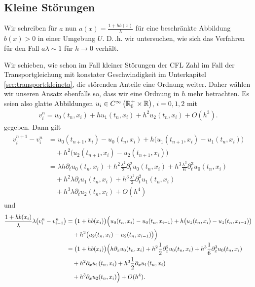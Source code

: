 \subsection*{Kleine Störungen}

Wir schreiben für $a$ nun $a(x) = \frac{1 + h b(x)}{\lambda}$ für eine
beschränkte Abbildung $b(x) > 0$ in einer Umgebung $U$. D.\,.h. wir untersuchen,
wie sich das Verfahren für den Fall $a \lambda \sim 1$ für $h \to 0$ verhält.

Wir schieben, wie schon im Fall kleiner Störungen der CFL Zahl im Fall der
Transportgleichung mit konstater Geschwindigkeit im Unterkapitel
\ref{sec:transport:kleineta}, die störenden Anteile eine Ordnung weiter. Daher
wählen wir unseren Ansatz ebenfalls so, dass wir eine Ordnung in $h$ mehr
betrachten. Es seien also glatte Abbildungen $u_i \in C^{\infty}\left( \mathbb R^+_0 \times \mathbb R \right)$, $i = 0,1,2$ mit
\begin{align}
\label{eq:varadv:kleina:ansatz}
v^n_i = u_0(t_n, x_i) + h u_1(t_n, x_i) + h^2 u_2(t_n, x_i) + O(h^3).
\end{align}
gegeben.
Dann gilt
\begin{align}
\label{eq:varadv:kleina:diff1}
\begin{split}
v^{n+1}_i - v^n_i &= u_0(t_{n+1}, x_i) - u_0(t_n, x_i) + h \bigl( u_1(t_{n+1}, x_i) - u_1(t_n, x_i) \bigr)\\
&\quad + h^2 \bigl( u_2(t_{n+1}, x_i) - u_2(t_{n+1}, x_i) \bigr)\\
&= \lambda h \partial_t u_0(t_n, x_i) + h^2 \frac{\lambda^2}{2} \partial^2_t u_0(t_n, x_i) + h^3 \frac{\lambda^3}{6} \partial^3_t u_0(t_n, x_i)\\
&\quad + h^2 \lambda \partial_t u_1(t_n, x_i) + h^3 \frac{\lambda^2}{2} \partial^2_t u_1(t_n, x_i)\\
&\quad + h^3 \lambda \partial_t u_2(t_n, x_i) + O(h^4)
\end{split}
\end{align}
und
\begin{align}
\label{eq:varadv:kleina:diff2}
\begin{split}
\frac{1 + h b(x_i)}{\lambda} \lambda \bigl( v^n_i - v^n_{i-1} \bigr) &= \bigl(1 + h b(x_i) \bigr) \Bigl( u_0(t_n, x_i) - u_0(t_n, x_{i-1}) + h \bigl( u_1(t_n, x_i) - u_1(t_n, x_{i-1}) \bigr) \\
&\quad + h^2 \bigl( u_2(t_n, x_i) - u_2(t_n, x_{i-1}) \bigr) \Bigr)\\
&= \bigl(1 + h b(x_i) \bigr) \Bigl( h \partial_x u_0(t_n, x_i) + h^2 \frac{1}{2} \partial^2_x u_0(t_n, x_i) + h^3 \frac{1}{6} \partial^3_x u_0(t_n, x_i)\\
&\quad + h^2 \partial_x u_1(t_n, x_i) + h^3 \frac{1}{2} \partial_x u_1(t_n, x_i)\\
&\quad + h^3 \partial_x u_2(t_n, x_i) \Bigr) + O(h^4).
\end{split}
\end{align}
